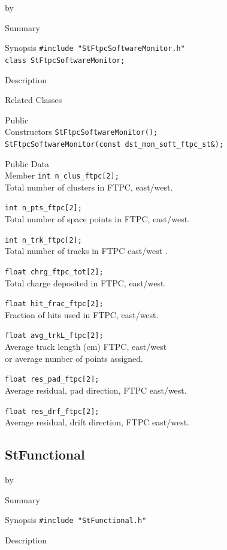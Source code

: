 \documentclass[twoside]{article}
\newcommand{\entrylabel}[1]{\mbox{\textbf{{#1}}}\hfil}%
\newenvironment{entry}
{\begin{list}{}%
    {\renewcommand{\makelabel}{\entrylabel}%
     \setlength{\labelwidth}{90pt}%
     \setlength{\leftmargin}{\labelwidth}
     \advance\leftmargin by \labelsep%
      }%
    }%
  {\end{list}}
\newcommand{\Entrylabel}[1]%
{\raisebox{0pt}[1ex][0pt]{\makebox[\labelwidth][l]%
    {\parbox[t]{\labelwidth}{\hspace{0pt}\textbf{{#1}}}}}}
\newenvironment{Entry}%
{\renewcommand{\entrylabel}{\Entrylabel}\begin{entry}}%
  {\end{entry}}
\begin{document}
\begin{Entry}
\item[Summary]
\item[Synopsis]
    \verb+#include "StFtpcSoftwareMonitor.h"+\\
    \verb+class StFtpcSoftwareMonitor;+\\
\item[Description]
\item[Related Classes]
\item[Public\\ Constructors]
    \verb+StFtpcSoftwareMonitor();+\\

    \verb+StFtpcSoftwareMonitor(const dst_mon_soft_ftpc_st&);+\\
\item[Public Data\\ Member]
    \verb+int n_clus_ftpc[2];+\\
    Total number of clusters in FTPC, east/west.
    
    \verb+int n_pts_ftpc[2];+\\
    Total number of space points in FTPC, east/west.
    
    \verb+int n_trk_ftpc[2];+\\
    Total number of tracks in FTPC east/west .
    
    \verb+float chrg_ftpc_tot[2];+\\
    Total charge deposited in FTPC, east/west.
    
    \verb+float hit_frac_ftpc[2];+\\
    Fraction of hits used in FTPC, east/west.
    
    \verb+float avg_trkL_ftpc[2];+\\
    Average track length (cm) FTPC, east/west \\
    or average number of points assigned.
    
    \verb+float res_pad_ftpc[2];+\\
    Average residual, pad direction, FTPC east/west.
    
    \verb+float res_drf_ftpc[2];+\\
    Average residual, drift direction, FTPC east/west.
\end{Entry}
\clearpage


\subsection{StFunctional}
\label{sec:StFunctional}
\begin{Entry}
\item[Summary]
\item[Synopsis]
    \verb+#include "StFunctional.h"+\\
\item[Description]
\end{Entry}
\clearpage
\end{document}
